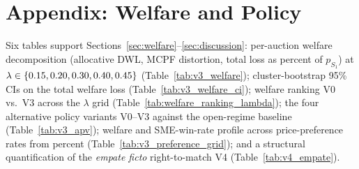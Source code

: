 \section{Appendix: Welfare and Policy}\label{app:welfare}

Six tables support Sections~\ref{sec:welfare}--\ref{sec:discussion}: per-auction welfare decomposition (allocative DWL, MCPF distortion, total loss as percent of $p_{S_1}$) at $\lambda \in \{0.15, 0.20, 0.30, 0.40, 0.45\}$ (Table~\ref{tab:v3_welfare}); cluster-bootstrap 95\% CIs on the total welfare loss (Table~\ref{tab:v3_welfare_ci}); welfare ranking V0 vs.\ V3 across the $\lambda$ grid (Table~\ref{tab:welfare_ranking_lambda}); the four alternative policy variants V0--V3 against the open-regime baseline (Table~\ref{tab:v3_apv}); welfare and SME-win-rate profile across price-preference rates from \prefGridRange{} percent (Table~\ref{tab:v3_preference_grid}); and a structural quantification of the \emph{empate ficto} right-to-match V4 (Table~\ref{tab:v4_empate}).








